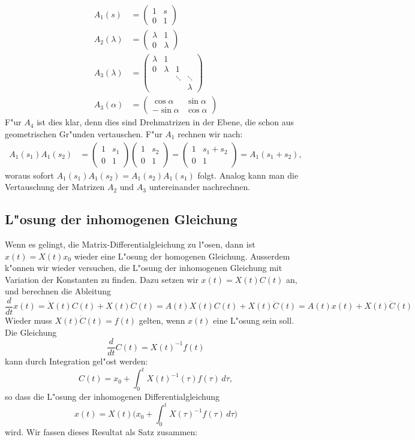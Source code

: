 \begin{align*}
A_1(s)&=\begin{pmatrix}1&s\\0&1\end{pmatrix}\\
A_2(\lambda)&=\begin{pmatrix}\lambda&1\\0&\lambda\end{pmatrix}\\
A_3(\lambda)&=\begin{pmatrix}\lambda&      1&      &       \\
                                   0&\lambda&     1&       \\
                                    &       &\ddots&\ddots \\
                                    &       &      &\lambda\end{pmatrix}\\
A_3(\alpha)&=\begin{pmatrix}\cos \alpha&\sin \alpha\\-\sin \alpha&\cos \alpha\end{pmatrix}
\end{align*}
F"ur $A_4$ ist dies klar, denn dies sind Drehmatrizen in der Ebene,
die schon aus geometrischen Gr"unden vertauschen.
F"ur $A_1$ rechnen wir nach:
\begin{align*}
A_1(s_1)A_1(s_2)
&=
\begin{pmatrix}1&s_1\\0&1\end{pmatrix}
\begin{pmatrix}1&s_2\\0&1\end{pmatrix}
=
\begin{pmatrix}1&s_1+s_2\\0&1\end{pmatrix}
=
A_1(s_1+s_2),
\end{align*}
woraus sofort
$
A_1(s_1)A_1(s_2)=
A_1(s_2)A_1(s_1)
$
folgt.
Analog kann man die Vertauschung der Matrizen $A_2$ und $A_3$ untereinander
nachrechnen.

\subsection{L"osung der inhomogenen Gleichung}
Wenn es gelingt, die Matrix-Differentialgleichung zu l"osen, dann
ist $x(t)=X(t)x_0$ wieder eine L"osung der homogenen Gleichung.
Ausserdem k"onnen wir wieder versuchen, die L"osung der inhomogenen
Gleichung mit Variation der Konstanten zu finden.
%
Dazu setzen wir $x(t)=X(t)C(t)$ an, und berechnen die Ableitung
\[
\frac{d}{dt}x(t)
=
\dot{X}(t)C(t)+X(t)\dot{C}(t)
=
A(t)X(t)C(t)+X(t)\dot{C}(t)
=
A(t)x(t)+X(t)\dot{C}(t)
\]
Wieder muss $X(t)\dot{C}(t)=f(t)$ gelten, wenn $x(t)$ eine L"osung sein
soll.
Die Gleichung
\[
\frac{d}{dt}C(t)
=
X(t)^{-1}f(t)
\]
kann durch Integration gel"ost werden:
\[
C(t)
=x_0+\int_0^t X(t)^{-1}(\tau)f(\tau)\,d\tau,
\]
so dass die L"osung der inhomogenen Differentialgleichung
\[
x(t)=X(t)\biggl(x_0+\int_0^t X(\tau)^{-1} f(\tau)\,d\tau\biggr)
\]
wird.
Wir fassen dieses Resultat als Satz zusammen:

